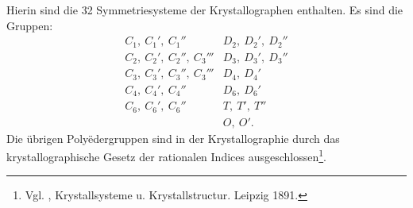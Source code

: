 Hierin sind die 32 Symmetriesysteme der Krystallographen enthalten. Es sind die Gruppen:
\[
\begin{array}{ll}
C_1,\ C_1',\ C_1'' & D_2,\ D_2',\ D_2''\\
C_2,\ C_2',\ C_2'',\ C_3''' & D_3,\ D_3',\ D_3''\\ %
C_3,\ C_3',\ C_3'',\ C_3''' & D_4,\ D_4'\\
C_4,\ C_4',\ C_4'' & D_6,\ D_6'\\
C_6,\ C_6',\ C_6'' & T,\ T',\ T''\\
 & O,\ O'.
\end{array}
\]
Die übrigen Poly\"edergruppen sind in der Krystallographie durch das krystallographische Gesetz der rationalen Indices ausgeschlossen\footnote{Vgl. , Krystallsysteme u. Krystallstructur. Leipzig 1891.}.
